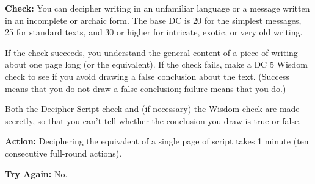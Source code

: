 
\textbf{Check:} You can decipher writing in an unfamiliar language or a message written in an incomplete or archaic form. The base DC is 20 for the simplest messages, 25 for standard texts, and 30 or higher for intricate, exotic, or very old writing.

If the check succeeds, you understand the general content of a piece of writing about one page long (or the equivalent). If the check fails, make a DC 5 Wisdom check to see if you avoid drawing a false conclusion about the text. (Success means that you do not draw a false conclusion; failure means that you do.)

Both the Decipher Script check and (if necessary) the Wisdom check are made secretly, so that you can't tell whether the conclusion you draw is true or false.

\textbf{Action:} Deciphering the equivalent of a single page of script takes 1 minute (ten consecutive full-round actions).

\textbf{Try Again:} No.
